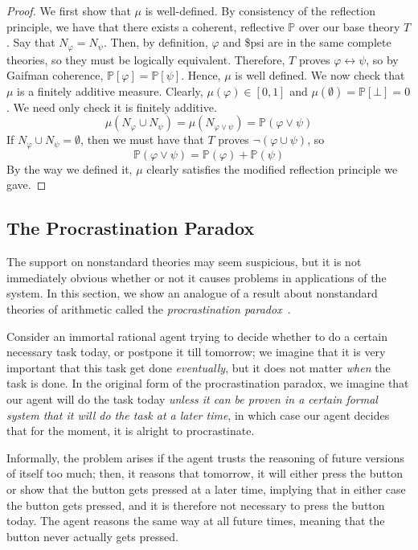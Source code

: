 \documentclass[12pt]{article}
\newcommand{\PP}{\mathbb{P}}
\newcommand{\vp}{\varphi}
\newcommand{\coh}{coherent}
\theoremstyle{plain}
\theoremstyle{definition}
\theoremstyle{remark}
\begin{document}
\begin{proof}
We first show that $\mu$ is well-defined. By consistency of the reflection principle, we have that there exists a \coh, reflective $\PP$ over our base theory $T$.
Say that $N_{\vp}=N_{\psi}$. Then, by definition, $\vp$ and \$psi are in the same complete theories, so they must be logically equivalent. Therefore, $T$ proves $\vp\leftrightarrow\psi$, so by Gaifman coherence, $\PP[\vp]=\PP[\psi]$. Hence, $\mu$ is well defined.
We now check that $\mu$ is a finitely additive measure. Clearly, $\mu(\vp)\in[0,1]$ and $\mu(\emptyset)=\PP[\bot]=0$.
We need only check it is finitely additive. 
$$\mu(N_{\vp}\cup N_{\psi})=\mu(N_{\vp\vee\psi})=\PP(\vp\vee\psi)$$
If $N_{\vp}\cup N_{\psi}=\emptyset$, then we must have that $T$ proves $\neg(\vp\cup\psi)$, so 
$$\PP(\vp\vee\psi)=\PP(\vp)+\PP(\psi)$$
By the way we defined it, $\mu$ clearly satisfies the modified reflection principle we gave.
\end{proof}
\subsection{The Procrastination Paradox}


The support on nonstandard theories may seem suspicious, but it is not immediately obvious whether or not it causes problems in applications of the system. In this section, we show an analogue of a result about nonstandard theories of arithmetic called the \emph{procrastination paradox}~\cite{yudkowsky13}. 

Consider an immortal rational agent trying to decide whether to do a certain necessary task today, or postpone it till tomorrow; we imagine that it is very important that this task get done \emph{eventually}, but it does not matter \emph{when} the task is done. In the original form of the procrastination paradox, we imagine that our agent will do the task today \emph{unless it can be proven in a certain formal system that it will do the task at a later time}, in which case our agent decides that for the moment, it is alright to procrastinate.

Informally, the problem arises if the agent trusts the reasoning of future versions of itself too much; then, it reasons that tomorrow, it will either press the button or show that the button gets pressed at a later time, implying that in either case the button gets pressed, and it is therefore not necessary to press the button today. The agent reasons the same way at all future times, meaning that the button never actually gets pressed.
\end{document}
